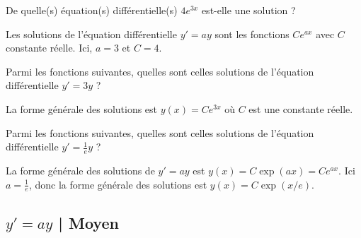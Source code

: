 \begin{question}
De quelle(s) équation(s) différentielle(s) $4 e^{3x}$ est-elle une solution ?
\begin{answers}
\end{answers}
\begin{explanations}
Les solutions de l'équation différentielle $y'=ay$ sont les fonctions $C e^{ax}$ avec $C$ constante réelle. Ici, $a=3$ et $C=4$.
\end{explanations}
\end{question}


\begin{question}
Parmi les fonctions suivantes, quelles sont celles solutions de l'équation différentielle $y' = 3y$ ?
\begin{answers}  
\end{answers}
\begin{explanations}
La forme générale des solutions est $y(x) = Ce^{3x}$ où $C$ est une constante réelle.
\end{explanations}
\end{question}


\begin{question}
Parmi les fonctions suivantes, quelles sont celles solutions de l'équation différentielle $y' = \frac1e y$ ?
\begin{answers}
\end{answers}
\begin{explanations}
La forme générale des solutions de $y' = ay$ est $y(x) = C \exp(ax) = Ce^{ax}$. Ici $a = \frac 1 e$, donc la forme générale des solutions est $y(x) = C\exp(x/e)$.
\end{explanations}
\end{question}


\subsection{$y'=ay$ | Moyen}


